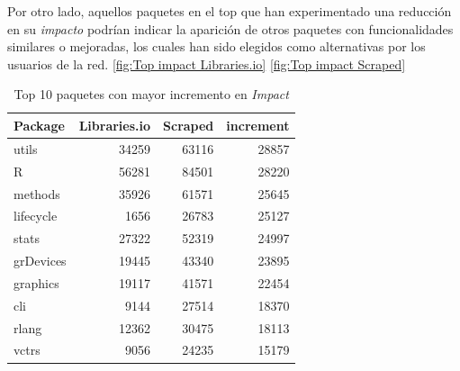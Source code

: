 Por otro lado, aquellos paquetes en el top que han experimentado una reducción en su \textit{impacto}
podrían indicar la aparición de otros paquetes con funcionalidades similares o mejoradas, los cuales han
sido elegidos como alternativas por los usuarios de la red. \ref{fig:Top impact Libraries.io} \ref{fig:Top impact Scraped}

\begin{table}[ht!]
    \begin{center}
        \begin{tabular}{|l|r|r|r|}
            \hline
            \textbf{Package} & \textbf{Libraries.io} & \textbf{Scraped} & \textbf{increment} \\
            \hline
            utils            & 34259                 & 63116            & 28857              \\
            R                & 56281                 & 84501            & 28220              \\
            methods          & 35926                 & 61571            & 25645              \\
            lifecycle        & 1656                  & 26783            & 25127              \\
            stats            & 27322                 & 52319            & 24997              \\
            grDevices        & 19445                 & 43340            & 23895              \\
            graphics         & 19117                 & 41571            & 22454              \\
            cli              & 9144                  & 27514            & 18370              \\
            rlang            & 12362                 & 30475            & 18113              \\
            vctrs            & 9056                  & 24235            & 15179              \\
            \hline
        \end{tabular}
        \caption{Top 10 paquetes con mayor incremento en \textit{Impact}}
        \label{tab:Top 10 paquetes con mayor incremento en Impact}
    \end{center}
\end{table}

